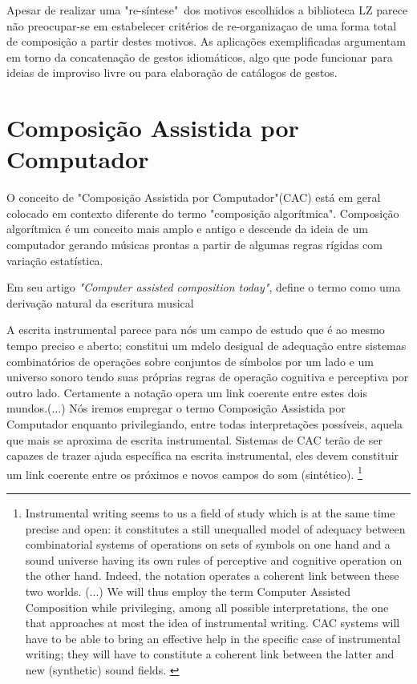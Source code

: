 \documentclass[
	12pt,				%
	openright,			%
	twoside,			%
	a4paper,			%
	english,			%
	french,				%
	spanish,			%
	brazil				%
	]{abntex2}
\begin{document}
Apesar de realizar uma "re-síntese"\ dos motivos escolhidos a biblioteca LZ parece não preocupar-se em estabelecer critérios de re-organizaçao de uma forma total de composição a partir destes motivos. As aplicações exemplificadas argumentam em torno da concatenação de gestos idiomáticos, algo que pode funcionar para ideias de improviso livre ou para elaboração de catálogos de gestos. 





\chapter{Composição Assistida por Computador}
\label{cac}

O conceito de "Composição Assistida por Computador"(CAC) está em geral colocado em contexto diferente do termo "composição algorítmica". Composição algorítmica é um conceito mais amplo e antigo e descende da ideia de um computador gerando músicas prontas a partir de algumas regras rígidas com variação estatística.

Em seu artigo \textit{"Computer assisted composition today"},  define o termo como uma derivação natural da escritura musical

\begin{citacao}
A escrita instrumental parece para nós um campo de estudo que é ao mesmo tempo preciso e aberto; constitui um mdelo desigual de adequação entre sistemas combinatórios de operações sobre conjuntos de símbolos por um lado e um universo sonoro tendo suas próprias regras  de operação cognitiva e perceptiva por outro lado. Certamente a notação opera um link coerente entre estes dois mundos.(...)
Nós iremos empregar o termo Composição Assistida por Computador enquanto privilegiando, entre todas interpretações possíveis, aquela que mais se aproxima de escrita instrumental. Sistemas de CAC terão de ser capazes de trazer ajuda específica na escrita instrumental, eles devem constituir um link coerente entre os próximos e novos campos do som (sintético). \cite[p. 07]{assayag1999computer} \footnote{
Instrumental writing seems to us a field of study which is at the same time precise and open: it constitutes a still unequalled model of adequacy between combinatorial systems of operations on sets of symbols on one hand and a sound universe having its own rules of perceptive and cognitive operation on the other hand. Indeed, the notation operates a coherent link between these two worlds. (...) We will thus employ the term Computer Assisted Composition while privileging, among all possible interpretations, the one that approaches at most the idea of instrumental writing. CAC systems will have to be able to bring an effective help in the specific case of instrumental writing; they will have to constitute a coherent link between the latter and new (synthetic) sound fields. \cite[p. 07]{assayag1999computer}}
\end{citacao}
\end{document}
